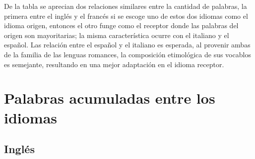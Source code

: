 De la tabla se aprecian dos relaciones similares entre la cantidad de palabras, la primera entre el inglés y el francés si se escoge uno de estos dos idiomas como el idioma origen, entonces el otro funge como el receptor donde las palabras del origen son mayoritarias; la misma característica ocurre con el italiano y el español.  Las relación entre el español y el italiano es esperada, al provenir ambas de la familia de las lenguas romances, la composición etimológica de sus vocablos es semejante,  resultando en una mejor adaptación en el idioma receptor.



\newpage

\section{Palabras acumuladas entre los idiomas}

\subsection{Inglés}


